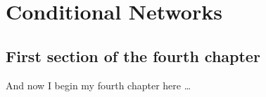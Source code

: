 \documentclass[thesis]{subfiles}
\begin{document}
\chapter{Conditional Networks}
\label{firstyear}
\ifpdf
    \graphicspath{{Chapter4/Figs/Raster/}{Chapter4/Figs/PDF/}{Chapter4/Figs/}}
\else
    \graphicspath{{Chapter4/Figs/Vector/}{Chapter4/Figs/}}
\fi

\section{First section of the fourth chapter}
And now I begin my fourth chapter here \dots
\end{document}
